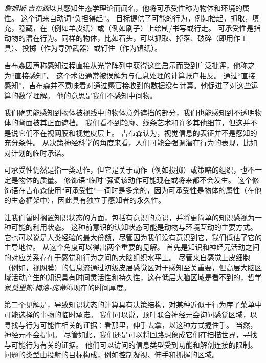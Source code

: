 \begin{proposition}[启示、感知和知识] \label{box:56_1}
	
	\quad \quad \textit{詹姆斯$\cdot$吉布森}以其感知生态学理论而闻名，他将可承受性称为物体和环境的属性。
	这个词来自动词“负担得起”。
	目标提供了可能的行为，例如抬起，抓取，填充，隐藏，在（例如羊皮纸）或（例如刷子）上绘制/书写或行走。
	可承受性是指动物的潜在行为。同样的物体，比如石头，可以抓取、掉落、破碎（即用作工具）、投掷（作为导弹武器）或钉住（作为镇纸）。
	
	\quad \quad 吉布森因声称感知过程直接从光学阵列中获得这些启示而受到广泛批评，他称之为“直接感知”。
	这个术语通常被误解为与信息处理的计算账户相反。
	通过“直接感知”，吉布森并不意味着对通过感官接收到的数据没有计算。他促进了对这些运算的数学理解。
	他的意思是我们不感知中间物。
	
	\quad \quad 我们确实能感知到物体被视线中的物体意外遮挡的部分，我们也能感知到不透明物体的背面被其正面遮挡。
	我们看不到轮廓、线条艺术和许多其他细节，但这并不是说它们不在视网膜和视觉皮层上。
	吉布森认为，视觉信息的表征并不是感知的充分条件。
	从决策神经科学的角度来看，人们可能会强调潜在行为的表现，比如对计划的临时承诺。
	
	\quad \quad 可承受性仍然是指一类动作，但它是关于动作（例如投掷）或策略的组织，也不一定是物体的质量。
	修饰语“临时”强调该动作可能现在或将来都不会发生。
	这个修饰语在吉布森使用“可承受性”一词时是多余的，因为可承受性是物体的属性（在他的生态框架中），因此具有独立于感知者的永久性。
	
\end{proposition}


让我们暂时搁置知识状态的方面，包括有意识的意识，并将更简单的知识感视为一种可能的利用状态。
这种前意识的认知状态可能是动物与环境互动的主要方式。
它也可以说是人类经验的最大份额，尽管因为我们没有意识到它，我们低估了它的主导地位。
从这个角度可以得出两个重要的见解。
首先是知识和神经元活动之间的对应关系存在于感觉和行为之间的大脑组织水平上。
尽管来自感觉上皮细胞（例如，视网膜）的信息流通过初级皮层感觉区对于感知至关重要，但高层大脑区域活动产生的知识具有时间灵活性和持久性，这在低层大脑区域是看不到的，哲学家\textit{莫里斯$\cdot$梅洛-庞蒂}称现在的时间厚度。


第二个见解是，导致知识状态的计算具有决策结构，对某种近似于行为库子菜单中可能选择的事物的临时承诺。
我们可以说，顶叶联合神经元会询问感觉区域，以寻找与行为可能性相关的证据：看那里，伸手去拿，以这种方式握住手。
当然，神经元不会提问。
尽管如此，我们还是可以将回路想象成它们在扫描世界，寻找与可能行为有关的证据。
他们可以访问的信息类型受到功能和解剖连接的限制。
问题的类型由投射的目标构成，例如控制凝视、伸手和抓握的区域。



